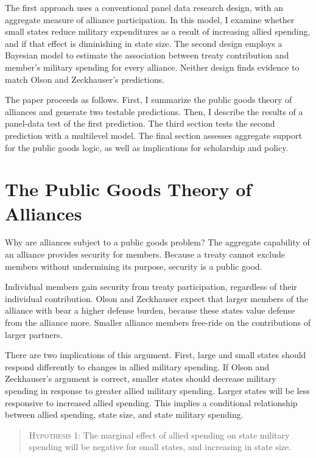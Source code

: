 \documentclass[12pt]{article}
\begin{document}
The first approach uses a conventional panel data research design, with an aggregate measure of alliance participation. 
In this model, I examine whether small states reduce military expenditures as a result of increasing allied spending, and if that effect is diminishing in state size. 
The second design employs a Bayesian model to estimate the association between treaty contribution and member's military spending for every alliance. 
Neither design finds evidence to match Olson and Zeckhauser's predictions. 


The paper proceeds as follows.
First, I summarize the public goods theory of alliances and generate two testable predictions.
Then, I describe the results of a panel-data test of the first prediction.
The third section tests the second prediction with a multilevel model. 
The final section assesses aggregate support for the public goods logic, as well as implications for scholarship and policy. 


\section{The Public Goods Theory of Alliances}


Why are alliances subject to a public goods problem? 
The aggregate capability of an alliance provides security for members. 
Because a treaty cannot exclude members without undermining its purpose, security is a public good. 


Individual members gain security from treaty participation, regardless of their individual contribution. 
Olson and Zeckhauser expect that larger members of the alliance with bear a higher defense burden, because these states value defense from the alliance more. 
Smaller alliance members free-ride on the contributions of larger partners. 


There are two implications of this argument. 
First, large and small states should respond differently to changes in allied military spending. 
If Olson and Zeckhauser's argument is correct, smaller states should decrease military spending in response to greater allied military spending. 
Larger states will be less responsive to increased allied spending. 
This implies a conditional relationship between allied spending, state size, and state military spending. 


\begin{quote}
\textsc{Hypothesis 1}: The marginal effect of allied spending on state military spending will be negative for small states, and increasing in state size. 
\end{quote}
\end{document}
